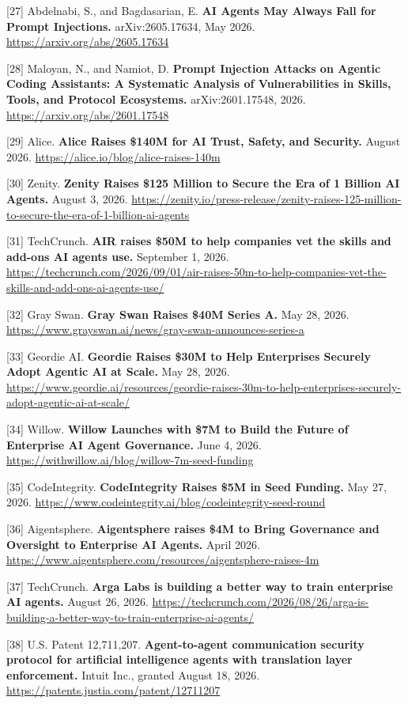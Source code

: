 \documentclass[
  10pt,
  letterpaper,
]{article}
\begin{document}
{[}27{]} Abdelnabi, S., and Bagdasarian, E. \textbf{AI Agents May Always
Fall for Prompt Injections.} arXiv:2605.17634, May 2026.
\url{https://arxiv.org/abs/2605.17634}

{[}28{]} Maloyan, N., and Namiot, D. \textbf{Prompt Injection Attacks on
Agentic Coding Assistants: A Systematic Analysis of Vulnerabilities in
Skills, Tools, and Protocol Ecosystems.} arXiv:2601.17548, 2026.
\url{https://arxiv.org/abs/2601.17548}

{[}29{]} Alice. \textbf{Alice Raises \$140M for AI Trust, Safety, and
Security.} August 2026. \url{https://alice.io/blog/alice-raises-140m}

{[}30{]} Zenity. \textbf{Zenity Raises \$125 Million to Secure the Era
of 1 Billion AI Agents.} August 3, 2026.
\url{https://zenity.io/press-release/zenity-raises-125-million-to-secure-the-era-of-1-billion-ai-agents}

{[}31{]} TechCrunch. \textbf{AIR raises \$50M to help companies vet the
skills and add-ons AI agents use.} September 1, 2026.
\url{https://techcrunch.com/2026/09/01/air-raises-50m-to-help-companies-vet-the-skills-and-add-ons-ai-agents-use/}

{[}32{]} Gray Swan. \textbf{Gray Swan Raises \$40M Series A.} May 28,
2026. \url{https://www.grayswan.ai/news/gray-swan-announces-series-a}

{[}33{]} Geordie AI. \textbf{Geordie Raises \$30M to Help Enterprises
Securely Adopt Agentic AI at Scale.} May 28, 2026.
\url{https://www.geordie.ai/resources/geordie-raises-30m-to-help-enterprises-securely-adopt-agentic-ai-at-scale/}

{[}34{]} Willow. \textbf{Willow Launches with \$7M to Build the Future
of Enterprise AI Agent Governance.} June 4, 2026.
\url{https://withwillow.ai/blog/willow-7m-seed-funding}

{[}35{]} CodeIntegrity. \textbf{CodeIntegrity Raises \$5M in Seed
Funding.} May 27, 2026.
\url{https://www.codeintegrity.ai/blog/codeintegrity-seed-round}

{[}36{]} Aigentsphere. \textbf{Aigentsphere raises \$4M to Bring
Governance and Oversight to Enterprise AI Agents.} April 2026.
\url{https://www.aigentsphere.com/resources/aigentsphere-raises-4m}

{[}37{]} TechCrunch. \textbf{Arga Labs is building a better way to train
enterprise AI agents.} August 26, 2026.
\url{https://techcrunch.com/2026/08/26/arga-is-building-a-better-way-to-train-enterprise-ai-agents/}

{[}38{]} U.S. Patent 12,711,207. \textbf{Agent-to-agent communication
security protocol for artificial intelligence agents with translation
layer enforcement.} Intuit Inc., granted August 18, 2026.
\url{https://patents.justia.com/patent/12711207}
\end{document}

